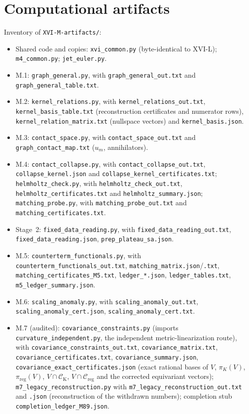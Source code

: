 \documentclass{article}
\theoremstyle{remark}
\newcommand{\Creg}{\mathcal C_{\mathrm{reg}}}
\begin{document}
\appendix
\section{Computational artifacts}
\label{app:script}

Inventory of \texttt{XVI-M-artifacts/}:
\begin{sloppypar}
\begin{itemize}
\item Shared code and copies: \texttt{xvi\_common.py} (byte-identical to XVI-L); \texttt{m4\_common.py}; \texttt{jet\_euler.py}.
\item M.1: \texttt{graph\_general.py}, with \texttt{graph\_general\_out.txt} and \texttt{graph\_general\_table.txt}.
\item M.2: \texttt{kernel\_relations.py}, with \texttt{kernel\_relations\_out.txt}, \texttt{kernel\_basis\_table.txt} (reconstruction certificates and numerator rows), \texttt{kernel\_relation\_matrix.txt} (nullspace vectors) and \texttt{kernel\_basis.json}.
\item M.3: \texttt{contact\_space.py}, with \texttt{contact\_space\_out.txt} and \texttt{graph\_contact\_map.txt} ($u_m$, annihilators).
\item M.4: \texttt{contact\_collapse.py}, with \texttt{contact\_collapse\_out.txt}, \texttt{collapse\_kernel.json} and \texttt{collapse\_kernel\_certificates.txt}; \texttt{helmholtz\_check.py}, with \texttt{helmholtz\_check\_out.txt}, \texttt{helmholtz\_certificates.txt} and \texttt{helmholtz\_summary.json}; \texttt{matching\_probe.py}, with \texttt{matching\_probe\_out.txt} and \texttt{matching\_certificates.txt}.
\item Stage~2: \texttt{fixed\_data\_reading.py}, with \texttt{fixed\_data\_reading\_out.txt}, \texttt{fixed\_data\_reading.json}, \texttt{prep\_plateau\_sa.json}.
\item M.5: \texttt{counterterm\_functionals.py}, with \texttt{counterterm\_functionals\_out.txt}, \texttt{matching\_matrix.json}/\texttt{.txt}, \texttt{matching\_certificates\_M5.txt}, \texttt{ledger\_*.json}, \texttt{ledger\_tables.txt}, \texttt{m5\_ledger\_summary.json}.
\item M.6: \texttt{scaling\_anomaly.py}, with \texttt{scaling\_anomaly\_out.txt}, \texttt{scaling\_anomaly\_cert.json}, \texttt{scaling\_anomaly\_cert.txt}.
\item M.7 (audited): \texttt{covariance\_constraints.py} (imports \texttt{curvature\_independent.py}, the independent metric-linearization route), with \texttt{covariance\_constraints\_out.txt}, \texttt{covariance\_matrix.txt}, \texttt{covariance\_certificates.txt}, \texttt{covariance\_summary.json}, \texttt{covariance\_exact\_certificates.json} (exact rational bases of $V$, $\pi_K(V)$, $\pi_{\mathrm{reg}}(V)$, $V\cap\mathcal C_{\mathrm K}$, $V\cap\Creg$ and the corrected equivariant vectors); \texttt{m7\_legacy\_reconstruction.py} with \texttt{m7\_legacy\_reconstruction\_out.txt} and \texttt{.json} (reconstruction of the withdrawn numbers); completion stub \texttt{completion\_ledger\_M89.json}.

\end{itemize}
\end{sloppypar}
\end{document}

